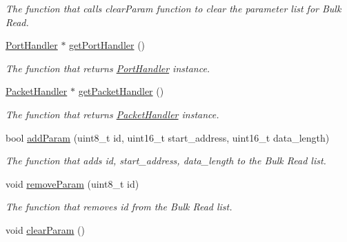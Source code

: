 \begin{DoxyCompactItemize}
\begin{DoxyCompactList}\small\item\em The function that calls clear\+Param function to clear the parameter list for Bulk Read. \end{DoxyCompactList}\item 
\hyperlink{classmercury_1_1_port_handler}{Port\+Handler} $\ast$ \hyperlink{classmercury_1_1_group_bulk_read_a611b27bd089d9452e33e7daea9b97df8}{get\+Port\+Handler} ()
\begin{DoxyCompactList}\small\item\em The function that returns \hyperlink{classmercury_1_1_port_handler}{Port\+Handler} instance. \end{DoxyCompactList}\item 
\hyperlink{classmercury_1_1_packet_handler}{Packet\+Handler} $\ast$ \hyperlink{classmercury_1_1_group_bulk_read_a0d8b00481238fab03625f4790e3e6941}{get\+Packet\+Handler} ()
\begin{DoxyCompactList}\small\item\em The function that returns \hyperlink{classmercury_1_1_packet_handler}{Packet\+Handler} instance. \end{DoxyCompactList}\item 
bool \hyperlink{classmercury_1_1_group_bulk_read_a1fdaca39d85fe45525d0da304bb8fa0b}{add\+Param} (uint8\+\_\+t id, uint16\+\_\+t start\+\_\+address, uint16\+\_\+t data\+\_\+length)
\begin{DoxyCompactList}\small\item\em The function that adds id, start\+\_\+address, data\+\_\+length to the Bulk Read list. \end{DoxyCompactList}\item 
void \hyperlink{classmercury_1_1_group_bulk_read_a381a49730d4590ba2c27d9ddccb8ac7c}{remove\+Param} (uint8\+\_\+t id)
\begin{DoxyCompactList}\small\item\em The function that removes id from the Bulk Read list. \end{DoxyCompactList}\item 
void \hyperlink{classmercury_1_1_group_bulk_read_a0611ad8878f2b265deaea81db47d21a3}{clear\+Param} ()\hypertarget{classmercury_1_1_group_bulk_read_a0611ad8878f2b265deaea81db47d21a3}{}\label{classmercury_1_1_group_bulk_read_a0611ad8878f2b265deaea81db47d21a3}


\end{DoxyCompactItemize}
